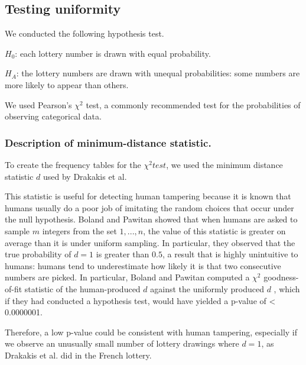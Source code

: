 \subsection{Testing uniformity}


We conducted the following hypothesis test.

$H_0$: each lottery number is drawn with equal probability.

$H_A$: the lottery numbers are drawn with unequal probabilities: some numbers are more likely to appear than others.

We used Pearson's $\chi^2$ test, a commonly recommended test for the probabilities of observing categorical data. 

\subsubsection{Description of minimum-distance statistic.}

To create the frequency tables for the $\chi^2 test$, we used the minimum distance statistic $d$ used by Drakakis et al.


This statistic is useful for detecting human tampering because it is known that humans usually do a
poor job of imitating the random choices that occur under the null hypothesis. Boland and Pawitan showed
that when humans are asked to sample $m$ integers from the set ${1,...,n}$, the value
of this statistic is greater on average than it is under uniform sampling. In particular,
they observed that the true probability of $d = 1$ is greater than $0.5$, a result that 
is highly unintuitive to humans: humans tend to underestimate how likely it is that
two consecutive numbers are picked. In particular, Boland and Pawitan
computed a $\chi^2$ goodness-of-fit statistic of the human-produced $d$ against the uniformly produced $d$
, which if they had conducted a hypothesis test, would have yielded a 
p-value of < 0.0000001. 

Therefore, a low p-value could be consistent with human tampering, especially if we
observe an unusually small number of lottery drawings where $d = 1$, as Drakakis et al.
did in the French lottery. 

